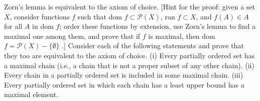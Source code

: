 \begin{exercise} Zorn's lemma is equivalent to the axiom of choice. [Hint for the proof: given a set $X$, consider functions $f$ such that dom $f \subset \mathcal{P}(X)$, ran $f \subset X$, and $f(A) \in A$ for all $A$ in dom $f$; order these functions by extension, use Zorn's lemma to find a maximal one among them, and prove that if $f$ is maximal, then dom $f = \mathcal{P}(X) - \{ \emptyset \}$ .] Consider each of the following statements and prove that they too are equivalent to the axiom of choice. (i) Every partially ordered set has a maximal chain (i.e., a chain that is not a proper subset of any other chain). (ii) Every chain in a partially ordered set is included in some maximal chain. (iii) Every partially ordered set in which each chain has a least upper bound has a maximal element.
\end{exercise}